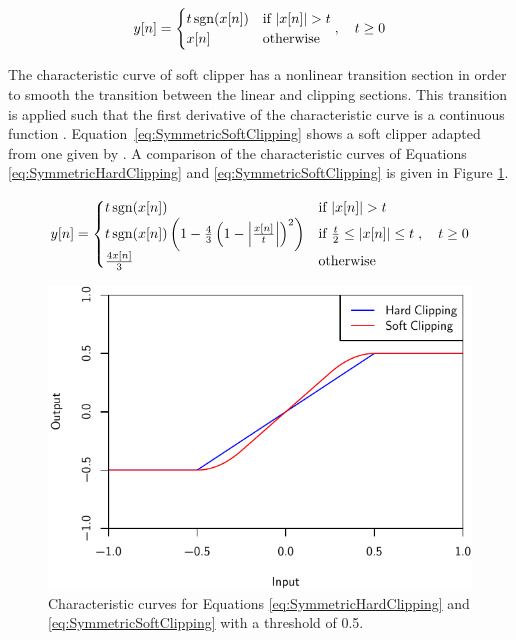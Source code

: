 		\begin{equation}
			y[n] = \begin{cases}
				t\operatorname{sgn}(x[n]) & \text{if $\left|x[n]\right| > t$} \\
				x[n] & \text{otherwise}
			\end{cases}, \quad t \geq 0
			\label{eq:SymmetricHardClipping}
		\end{equation}
		
		The characteristic curve of soft clipper has a nonlinear transition section in order to smooth the
		transition between the linear and clipping sections. This transition is applied such that the first
		derivative of the characteristic curve is a continuous function \citep{esqueda2015aliasing}.
		Equation~\ref{eq:SymmetricSoftClipping} shows a soft clipper adapted from one given by
		\citet{dutilleux2011nonlinear}. A comparison of the characteristic curves of Equations
		\ref{eq:SymmetricHardClipping} and \ref{eq:SymmetricSoftClipping} is given in Figure \ref{fig:Clipping}.

		\begin{equation}
			y[n] = \begin{cases}
				t\operatorname{sgn}(x[n]) & \text{if $\left|x[n]\right| > t$} \\
				t\operatorname{sgn}(x[n]) \left( 1 - \frac{4}{3} \left( 1 - \left|\frac{x[n]}{t}\right| \right)^{2}
				           \right) & \text{if $\frac{t}{2} \leq \left|x[n]\right| \leq t$} \\
				\frac{4x[n]}{3} & \text{otherwise}
			\end{cases}, \quad t \geq 0
			\label{eq:SymmetricSoftClipping}
		\end{equation}

		\begin{figure}[h!]
			\centering
			\includegraphics{chapter3/Images/Clipping.pdf}
			\caption{Characteristic curves for Equations \ref{eq:SymmetricHardClipping} and
				 \ref{eq:SymmetricSoftClipping} with a threshold of 0.5.}
			\label{fig:Clipping}
		\end{figure}

